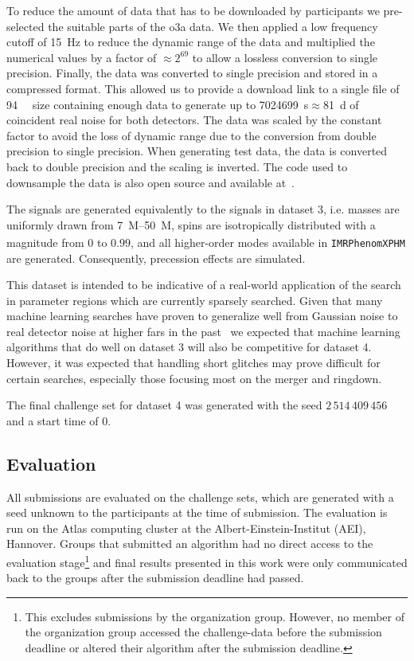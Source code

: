 To reduce the amount of data that has to be downloaded by participants we pre-selected the suitable parts of the \acrshort{o3a} data. We then applied a low frequency cutoff of \SI{15}{\hertz} to reduce the dynamic range of the data and multiplied the numerical values by a factor of $\approx 2^{69}$ to allow a lossless conversion to single precision. Finally, the data was converted to single precision and stored in a compressed format. This allowed us to provide a download link to a single file of \SI{94}{\giga\byte} size containing enough data to generate up to \SI{7024699}{\second}$\approx$\SI{81}{\day} of coincident real noise for both detectors. The data was scaled by the constant factor to avoid the loss of dynamic range due to the conversion from double precision to single precision. When generating test data, the data is converted back to double precision and the scaling is inverted. The code used to downsample the data is also open source and available at~\cite{github}.

The signals are generated equivalently to the signals in dataset 3, i.e. masses are uniformly drawn from \SIrange{7}{50}{M_\odot}, spins are isotropically distributed with a magnitude from $0$ to $0.99$, and all higher-order modes available in \verb|IMRPhenomXPHM| are generated. Consequently, precession effects are simulated.

This dataset is intended to be indicative of a real-world application of the search in parameter regions which are currently sparsely searched. Given that many machine learning searches have proven to generalize well from Gaussian noise to real detector noise at higher \acrshort{far}s in the past~\cite{George:2017pmj, Gebhard:2019ldz, Krastev:2020skk, Wei:2020ztw} we expected that machine learning algorithms that do well on dataset 3 will also be competitive for dataset 4. However, it was expected that handling short glitches may prove difficult for certain searches, especially those focusing most on the merger and ringdown.

The final challenge set for dataset 4 was generated with the seed $2\,514\,409\,456$ and a start time of $0$.

\subsection{Evaluation}\label{sec:metrics}
All submissions are evaluated on the challenge sets, which are generated with a seed unknown to the participants at the time of submission. The evaluation is run on the Atlas computing cluster at the Albert-Einstein-Institut (AEI), Hannover. Groups that submitted an algorithm had no direct access to the evaluation stage\footnote{This excludes submissions by the organization group. However, no member of the organization group accessed the challenge-data before the submission deadline or altered their algorithm after the submission deadline.} and final results presented in this work were only communicated back to the groups after the submission deadline had passed.


